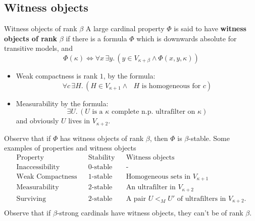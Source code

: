 \documentclass{article}
\begin{document}
\subsection{Witness objects}
\begin{fancydefine}{Witness objects of rank $\beta$}
    A large cardinal property $\Phi$ is said to have \textbf{witness objects of rank} $\beta$ if there is a formula $\Phi$ which is downwards absolute for transitive models, and \[ \Phi(\kappa) \Leftrightarrow \forall x \, \exists y. \, (y \in V_{\kappa + \beta} \wedge \Phi(x,y,\kappa))\]
\end{fancydefine}
\begin{exs*}\hspace{0.1cm}
    \begin{itemize}
        \item Weak compactness is rank $1$, by the formula: \[ \forall c \, \exists H. \, (H \in V_{\kappa+1} \wedge \text{ $H$ is homogeneous for $c$})\] 
        \item Measurability by the formula: \[ \exists U. \, (U \text{ is a $\kappa$ complete n.p. ultrafilter on $\kappa$})\] and obviously $U$ lives in $V_{\kappa+2}$.
    \end{itemize}
\end{exs*}
Observe that if $\Phi$ has witness objects of rank $\beta$, then $\Phi$ is $\beta$-stable. Some examples of properties and witness objects
\begin{align*}
    \text{Property} && \text{Stability} & & \text{Witness objects}\\
    \text{Inaccessibility} & & \text{$0$-stable} & & \text{-}\\
    \text{Weak Compactness} & & \text{$1$-stable} & & \text{Homogeneous sets in $V_{\kappa+1}$}\\
    \text{Measurability} & & \text{$2$-stable} & & \text{An ultrafilter in $V_{\kappa+2}$}\\
    \text{Surviving} & & \text{$2$-stable} & & \text{A pair $U<_{M} U'$ of ultrafilters in $V_{\kappa+2}$.}\\
\end{align*}
Observe that if $\beta$-strong cardinals have witness objects, they can't be of rank $\beta$.
\end{document}

